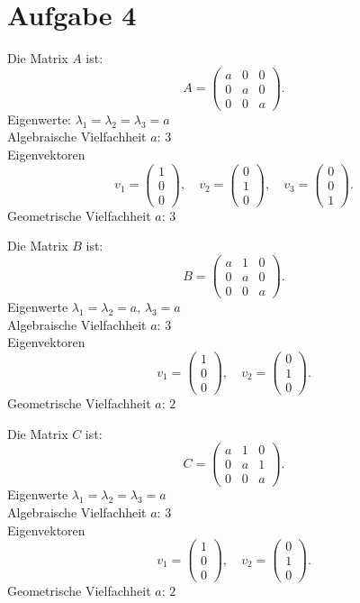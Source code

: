\section{Aufgabe 4}

Die Matrix \( A \) ist:
\[
A = \begin{pmatrix}
a & 0 & 0 \\
0 & a & 0 \\
0 & 0 & a
\end{pmatrix}.
\]
Eigenwerte: \( \lambda_1 = \lambda_2 = \lambda_3 = a \) \\
Algebraische Vielfachheit \( a \): \( 3 \) \\
Eigenvektoren
\[
v_1 = \begin{pmatrix} 1 \\ 0 \\ 0 \end{pmatrix}, \quad
v_2 = \begin{pmatrix} 0 \\ 1 \\ 0 \end{pmatrix}, \quad
v_3 = \begin{pmatrix} 0 \\ 0 \\ 1 \end{pmatrix}.
\]
Geometrische Vielfachheit \( a \): \( 3 \)

Die Matrix \( B \) ist:
\[
B = \begin{pmatrix}
a & 1 & 0 \\
0 & a & 0 \\
0 & 0 & a
\end{pmatrix}.
\]
Eigenwerte \( \lambda_1 = \lambda_2 = a, \, \lambda_3 = a \) \\
Algebraische Vielfachheit \( a \): \( 3 \) \\
Eigenvektoren
\[
v_1 = \begin{pmatrix} 1 \\ 0 \\ 0 \end{pmatrix}, \quad
v_2 = \begin{pmatrix} 0 \\ 1 \\ 0 \end{pmatrix}.
\]
Geometrische Vielfachheit \( a \): \( 2 \)


Die Matrix \( C \) ist:
\[
C = \begin{pmatrix}
a & 1 & 0 \\
0 & a & 1 \\
0 & 0 & a
\end{pmatrix}.
\]
Eigenwerte \( \lambda_1 = \lambda_2 = \lambda_3 = a \) \\
Algebraische Vielfachheit \( a \): \( 3 \) \\
Eigenvektoren
\[
v_1 = \begin{pmatrix} 1 \\ 0 \\ 0 \end{pmatrix}, \quad
v_2 = \begin{pmatrix} 0 \\ 1 \\ 0 \end{pmatrix}.
\]
Geometrische Vielfachheit \( a \): \( 2 \)
